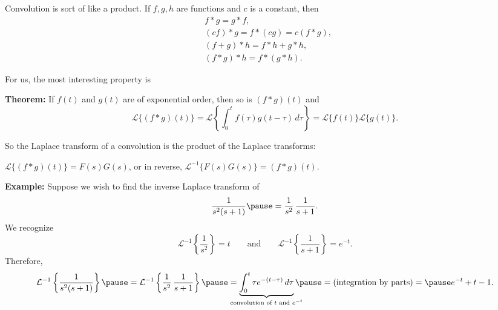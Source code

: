 \documentclass[10pt,aspectratio=169]{beamer}
\begin{document}
\begin{frame}
Convolution is sort of like a product.  If $f,g,h$ are functions and $c$
is a constant, then
\begin{align*}
& f * g = g * f , \\
& (c f) * g = f * (c g) = c (f*g) , \\
& (f+g) * h = f * h + g * h , \\
& ( f * g ) * h = f * ( g * h ) .
\end{align*}


\medskip
\pause

For us, the most
interesting property is

\medskip

\textbf{Theorem:}
If $f(t)$ and $g(t)$ are of exponential order, then
so is $(f*g)(t)$ and
\begin{equation*}
\mathcal{L} \bigl\{ (f*g)(t) \bigr\}
=
\mathcal{L} \left\{ \int_0^t f(\tau) g(t-\tau) \, d\tau \right\}
=
\mathcal{L} \bigl\{ f(t) \bigr\} \mathcal{L} \bigl\{ g(t) \bigr\} .
\end{equation*}

\medskip
\pause

So the Laplace transform of a convolution is the product
of the Laplace transforms:

\medskip
\qquad
${\mathcal{L}} \bigl\{ (f*g)(t) \bigr\} = F(s)G(s)$,
\pause
\qquad
or in reverse,
\qquad
${\mathcal{L}}^{-1} \bigl\{ F(s) G(s) \bigr\} = (f*g)(t)$.



\end{frame}

\begin{frame}
\textbf{Example:}
Suppose we wish to find the inverse Laplace transform of
\[
\frac{1}{s^2 (s+1)} \pause = 
\frac{1}{s^2}
\,
\frac{1}{s+1}
.
\]
\pause
We recognize
\[
\mathcal{L}^{-1} 
\left\{
\frac{1}{s^2} \right\} 
= t
\qquad \text{and} \qquad
\mathcal{L}^{-1} 
\left\{
\frac{1}{s+1} \right\}
= e^{-t} .
\]
\pause
Therefore,
\[
\mathcal{L}^{-1}
\left\{
\frac{1}{s^2(s+1)}
\right\}
\pause
=
\mathcal{L}^{-1}
\left\{
\frac{1}{s^2}
\,
\frac{1}{s+1}
\right\}
\pause
=
\underbrace{
\int_0^t
\tau e^{-(t-\tau)} \,d\tau
}_{\mathclap{\text{convolution of } t \text{ and } e^{-t}}}
\pause
=
\text{(integration by parts)}
=
\pause
e^{-t}+t-1 .
\]

\end{frame}
\end{document}

